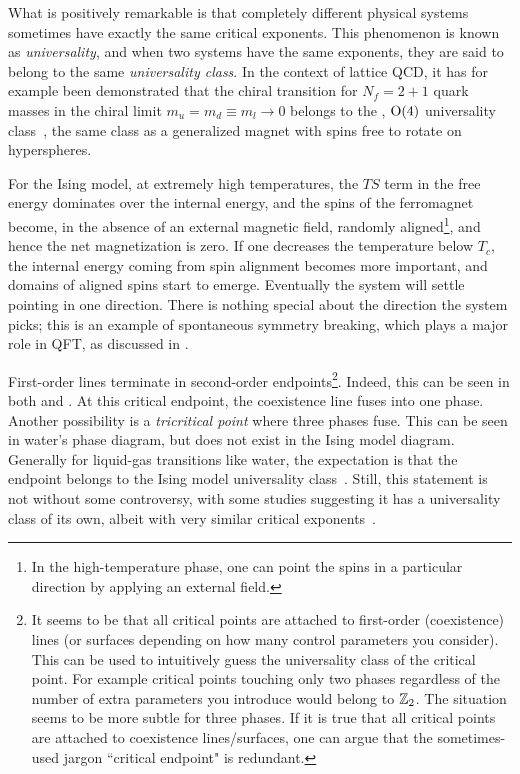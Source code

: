 What is positively remarkable is that completely different
physical systems sometimes have exactly the same critical exponents.
This phenomenon is known as {\it universality}, and when two
systems have the same exponents, they are said to belong to the same {\it
universality class}. In the context of lattice QCD,
it has for example been demonstrated that the chiral transition for $N_f=2+1$
quark masses in the chiral limit $m_u=m_d\equiv m_l\to0$ belongs to the
, $\operatorname{\text{O}}(4)$ universality class~\cite{ding_chiral_2019}, 
the same class as a generalized magnet with spins
free to rotate on  hyperspheres.

For the Ising model, at extremely high temperatures, 
the $TS$ term in the free energy dominates over
the internal energy, and the spins of the ferromagnet become, in the absence of
an external magnetic field, randomly aligned\footnote{In the high-temperature
phase, one can point the spins in a particular direction by applying an external
field.}, and hence the net magnetization is zero. If one decreases the
temperature below $T_c$, the internal energy coming from spin alignment becomes
more important, and domains of aligned spins start to emerge. Eventually the
system will settle pointing in one direction. There is nothing special about the
direction the system picks; this is an example of spontaneous symmetry
breaking, which plays a major role in QFT,
as discussed in . 


First-order lines terminate in second-order 
endpoints\footnote{It seems to be that
all critical points are attached to first-order (coexistence) lines
(or surfaces depending on how many control parameters you consider).
This can be used to intuitively guess the universality class of
the critical point. For example critical points touching only two phases
regardless of the number of extra parameters you introduce would
belong to $\mathbb{Z}_2$. The situation seems to be more subtle for three phases.
If it is true that all critical points are attached to coexistence
lines/surfaces, one can argue that the sometimes-used jargon
``critical endpoint" is redundant.}.
Indeed, this
can be seen in both  and .
At this critical endpoint, the coexistence line fuses into one phase.
Another possibility is a {\it tricritical point}
where three phases fuse. This can be seen in water's phase diagram, but
does not exist in the  Ising model diagram.
Generally for liquid-gas transitions like
water, the expectation is that the endpoint belongs to the Ising
model universality
class~\cite{hubbard_wilson_1972,bruce_scaling_1992,wilding_critical-point_1995,yarmolinsky_revisiting_2017}.
Still, this statement is not without some controversy, with some studies suggesting
it has a universality class of its own, albeit with very similar
critical exponents~\cite{valls_liquid-gas_1978}.

